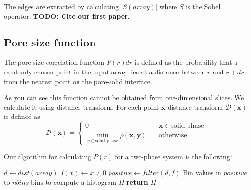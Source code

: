 \documentclass[reprint,amsmath,amssymb,aps,pre]{revtex4-1}
\begin{document}
The edges are extracted by calculating $|S(array)|$ where $S$ is the Sobel
operator. \textbf{TODO: Cite our first paper}.

\subsection{Pore size function}
The pore size correlation function $P(r)dr$ is defined as the probability that a
randomly chosen point in the input array lies at a distance between
$r$ and $r + dr$ from the nearest point on the pore-solid interface.

As you can see this function cannot be obtained from one-dimensional slices. We
calculate it using distance transform. For each point $\bm{x}$ distance
transform $\mathcal{D}(\bm{x})$ is defined as
\begin{equation*}
  \mathcal{D}(\bm{x})= \left\{
  \begin{array}{ll}
    0 & \quad \bm{x} \in \text{solid phase} \\
    \min\limits_{y \in \text{solid phase}} \rho(\bm{x},\bm{y}) & \quad \text{otherwise}
  \end{array}
\right.
\end{equation*}

Our algorithm for calculating $P(r)$ for a two-phase system is the following:
\begin{algorithmic}[1]
    \State $d \gets dist(array)$ 
    \State $f(x) \gets x \ne 0$
    \State $positive \gets filter(d, f)$
    \State Bin values in $positive$ to $nbins$ bins to compute a histogram $H$
    \State \textbf{return} $H$
  \EndProcedure
\end{algorithmic}
\end{document}
